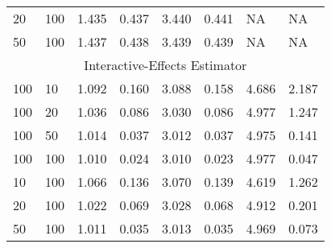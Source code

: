 \documentclass[a4paper]{article}
\begin{document}
\begin{table}[]
\begin{threeparttable}
\begin{tabular}{llllllll}
20  & 100 & 1.435                                                             & 0.437 & 3.440                                                             & 0.441 & NA                                                            & NA    \\
50  & 100 & 1.437                                                             & 0.438 & 3.439                                                             & 0.439 & NA                                                            & NA    \\
\multicolumn{8}{c}{Interactive-Effects   Estimator}                                                                                                                                                                                       \\
100 & 10  & 1.092                                                             & 0.160 & 3.088                                                             & 0.158 & 4.686                                                         & 2.187 \\
100 & 20  & 1.036                                                             & 0.086 & 3.030                                                             & 0.086 & 4.977                                                         & 1.247 \\
100 & 50  & 1.014                                                             & 0.037 & 3.012                                                             & 0.037 & 4.975                                                         & 0.141 \\
100 & 100 & 1.010                                                             & 0.024 & 3.010                                                             & 0.023 & 4.977                                                         & 0.047 \\
10  & 100 & 1.066                                                             & 0.136 & 3.070                                                             & 0.139 & 4.619                                                         & 1.262 \\
20  & 100 & 1.022                                                             & 0.069 & 3.028                                                             & 0.068 & 4.912                                                         & 0.201 \\
50  & 100 & 1.011                                                             & 0.035 & 3.013                                                             & 0.035 & 4.969                                                         & 0.073 \\ \hline
\end{tabular}


\end{threeparttable}
\end{table}
\end{document}
